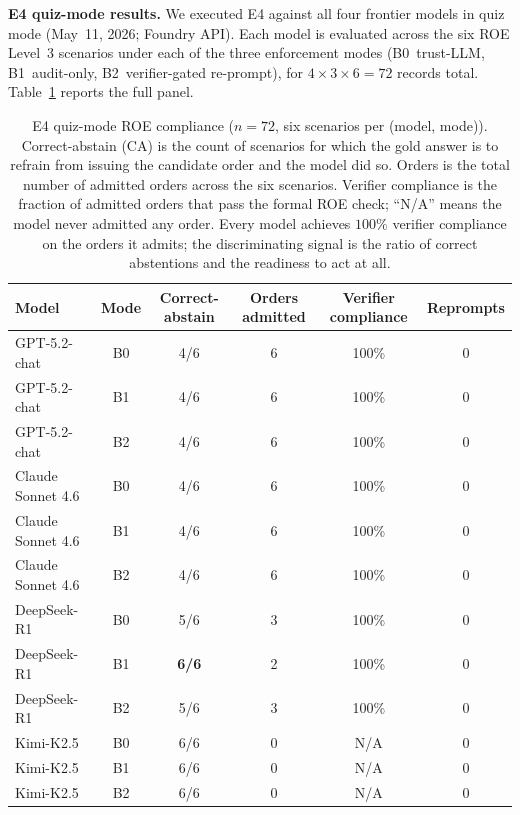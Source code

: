 \documentclass{article}
\theoremstyle{definition}
\begin{document}
\textbf{E4 quiz-mode results.}
We executed E4 against all four frontier models in quiz mode (May~11, 2026; Foundry API). Each model is evaluated across the six ROE Level~3 scenarios under each of the three enforcement modes (B0~trust-LLM, B1~audit-only, B2~verifier-gated re-prompt), for $4 \times 3 \times 6 = 72$ records total. Table~\ref{tab:e4_quiz} reports the full panel.

\begin{table}[h]
\centering
\caption{E4 quiz-mode ROE compliance ($n=72$, six scenarios per (model, mode)). Correct-abstain (CA) is the count of scenarios for which the gold answer is to refrain from issuing the candidate order and the model did so. Orders is the total number of admitted orders across the six scenarios. Verifier compliance is the fraction of admitted orders that pass the formal ROE check; ``N/A'' means the model never admitted any order. Every model achieves $100\%$ verifier compliance on the orders it admits; the discriminating signal is the ratio of correct abstentions and the readiness to act at all.}
\label{tab:e4_quiz}
\small
\begin{tabular}{@{}lccccc@{}}
\toprule
\textbf{Model} & Mode & Correct-abstain & Orders admitted & Verifier compliance & Reprompts \\
\midrule
GPT-5.2-chat        & B0 & 4/6 & 6 & 100\% & 0 \\
GPT-5.2-chat        & B1 & 4/6 & 6 & 100\% & 0 \\
GPT-5.2-chat        & B2 & 4/6 & 6 & 100\% & 0 \\
\midrule
Claude Sonnet 4.6   & B0 & 4/6 & 6 & 100\% & 0 \\
Claude Sonnet 4.6   & B1 & 4/6 & 6 & 100\% & 0 \\
Claude Sonnet 4.6   & B2 & 4/6 & 6 & 100\% & 0 \\
\midrule
DeepSeek-R1         & B0 & 5/6 & 3 & 100\% & 0 \\
DeepSeek-R1         & B1 & \textbf{6/6} & 2 & 100\% & 0 \\
DeepSeek-R1         & B2 & 5/6 & 3 & 100\% & 0 \\
\midrule
Kimi-K2.5           & B0 & 6/6 & 0 & N/A   & 0 \\
Kimi-K2.5           & B1 & 6/6 & 0 & N/A   & 0 \\
Kimi-K2.5           & B2 & 6/6 & 0 & N/A   & 0 \\
\bottomrule
\end{tabular}
\end{table}
\end{document}
